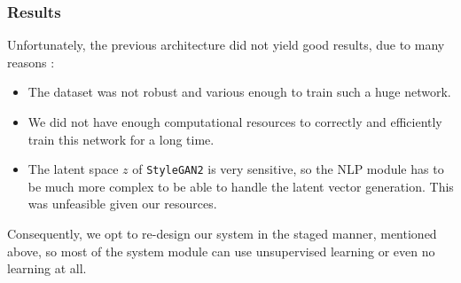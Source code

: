 \subsubsection{Results}

Unfortunately, the previous architecture did not yield good results, due to many reasons :
\begin{itemize}
    \item The dataset was not robust and various enough to train such a huge network.
    \item We did not have enough computational resources to correctly and efficiently train this network for a long time.
    \item The latent space $z$ of \texttt{StyleGAN2} is very sensitive, so the NLP module has to be much more complex to be able to handle the latent vector generation. This was unfeasible given our resources.
\end{itemize}

Consequently, we opt to re-design our system in the staged manner, mentioned above, so most of the system module can use unsupervised learning or even no learning at all. 
